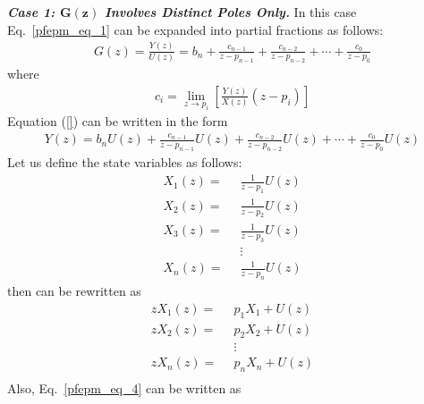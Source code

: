 \documentclass[12pt,a4paper,oneside]{book}
\begin{document}
\begin{onehalfspace}
\vspace{5mm}
\noindent\textbf{\textit{Case 1: $\mathbf{G(z)}$ Involves Distinct Poles Only.}} In this case Eq.~\eqref{pfepm_eq_1} can be expanded into partial fractions as follows:
\begin{equation}\label{pfepm_eq_2}
	\begin{aligned}
		G(z)=\frac{Y(z)}{U(z)} = b_n + \frac{c_{n-1}}{z-p_{n-1}}+\frac{c_{n-2}}{z-p_{n-2}}+\cdots+\frac{c_0}{z-p_0}
	\end{aligned}
\end{equation}
where
\begin{equation}\label{pfepm_eq_3}
	\begin{aligned}
		c_i = \lim_{z \to p_i} \left[\frac{Y(z)}{X(z)}(z-p_i)\right]
	\end{aligned}
\end{equation}
Equation (\ref{}) can be written in the form 
\begin{equation}\label{pfepm_eq_4}
	\begin{aligned}
		Y(z)= b_n U(z) + \frac{c_{n-1}}{z-p_{n-1}}U(z)+\frac{c_{n-2}}{z-p_{n-2}}U(z)+\cdots+\frac{c_0}{z-p_0}U(z)
	\end{aligned}
\end{equation}
Let us define the state variables as follows:
\begin{equation}\label{pfepm_eq_5}
	\begin{aligned}
		X_1(z)= & \enspace  \frac{1}{z-p_1}U(z) \\[6pt]
		X_2(z)= & \enspace  \frac{1}{z-p_2}U(z) \\[6pt]
		X_3(z)= & \enspace  \frac{1}{z-p_3}U(z) \\[6pt]
		& \enspace \vdots \\[6pt]
		X_n(z)= & \enspace  \frac{1}{z-p_n}U(z) 
	\end{aligned}
\end{equation}
then can be rewritten as
\begin{equation}\label{pfepm_eq_6}
	\begin{aligned}
		zX_1(z)= & \enspace  p_1X_1+U(z) \\[6pt]
		zX_2(z)= & \enspace  p_2X_2+U(z) \\[6pt]
		& \enspace \vdots \\[6pt]
		zX_n(z)= & \enspace  p_nX_n+U(z) \\[6pt]
	\end{aligned}
\end{equation}
Also, Eq.~\eqref{pfepm_eq_4} can be written as
\begin{equation}\label{pfepm_eq_7}

\end{equation}
\end{onehalfspace}
\end{document}
